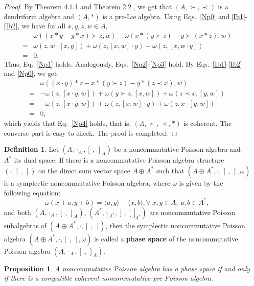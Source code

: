 \documentclass[12pt]{amsart}
\newtheorem{pro}[thm]{Proposition}
\theoremstyle{definition}
\newtheorem{defi}[thm]{Definition}
\begin{document}
 \begin{proof} By Theorem 4.1.1 \cite{B2} and Theorem 2.2 \cite{B1}, we get that $(A,\succ,\prec)$ is a dendriform algebra
and $(A,\ast)$ is a pre-Lie algebra. Using Eqs.~\eqref{Np0} and \eqref{Ib1}-\eqref{Ib2}, we have for all $x,y,z,w\in A$, 
 \begin{align*}&
 \omega((x\ast y-y\ast x)\succ z,w)-\omega(x\ast(y\succ z)-y\succ(x\ast z),w)\\
   =&\omega(z,w\cdot[x, y])+\omega(z,[x, w]\cdot y)
   -\omega(z,[x,w\cdot y])
   \\=&0.
  \end{align*}
Thus, Eq.~\eqref{Np1} holds. Analogously, Eqs.~\eqref{Np2}-\eqref{Np3} hold. 
By Eqs.~\eqref{Ib1}-\eqref{Ib2} and \eqref{Np0}, we get 
\begin{align*}& \omega((x\cdot y)\ast z-x\ast(y\succ z)-y\ast(z\prec x),w)
\\=&-\omega(z,[x\cdot y,w])+\omega(y\succ z,[x, w])+\omega(z\prec x,[y,w])
\\=&-\omega(z,[x\cdot y,w])+\omega( z,[x, w]\cdot y)+\omega(z, x\cdot[y,w])
\\=&0,
\end{align*}
which yields that Eq.~\eqref{Np4} holds, that is, $(A,\succ,\prec, \ast)$ is coherent.
The converse part is easy to check.
The proof is completed.
\end{proof}


\begin{defi}
Let $(A,\cdot_A, [ \ , \ ]_A)$ be a noncommutative Poisson algebra and $A^{*}$ its dual space. If there is a
noncommutative Poisson algebra structure $(\cdot, [ \ , \ ])$ on the direct sum vector space $A\oplus A^{*}$ such that
$(A\oplus A^{*},\cdot, [ \ , \ ],\omega)$ is a symplectic noncommutative Poisson algebra, where $\omega$ is given by the following equation:
 \begin{equation}\label{C2}\omega(x+a, y+b) =\langle a,y\rangle-\langle x,b\rangle, \forall~x, y\in A,~a, b\in A^{*},\end{equation}
and both $(A,\cdot_A,[ \ , \ ]_A)$, $(A^{*},\cdot|_{A^{*}},[ \ , \ ]|_{A^{*}})$ are noncommutative Poisson subalgebras 
of $(A\oplus A^{*},\cdot, [ \ , \ ])$, then the symplectic noncommutative Poisson
algebra $(A\oplus A^{*},\cdot, [ \ , \ ],\omega)$ is called a {\bf phase space} of the noncommutative Poisson algebra $(A,\cdot_A,[ \ , \ ]_A)$.
\end{defi}

\begin{pro}\label{Ps2} A noncommutative Poisson algebra has a phase space if and only if there is a compatible
 coherent noncommutative pre-Poisson algebra.
\end{pro}
\end{document}
